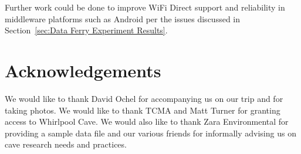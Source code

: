 \documentclass[10pt,twocolumn]{article}
\begin{document}
Further work could be done to improve WiFi Direct support and reliability in middleware platforms such as Android per the issues discussed in Section~\ref{sec:Data Ferry Experiment Results}.

\section{Acknowledgements}
\label{sec:Acknowledgements}
We would like to thank David Ochel for accompanying us on our trip and for taking photos. 
We would like to thank TCMA and Matt Turner for granting access to Whirlpool Cave. 
We would also like to thank Zara Environmental for providing a sample data file
and our various friends for informally advising us on cave research needs and practices.

% 



\end{document}

